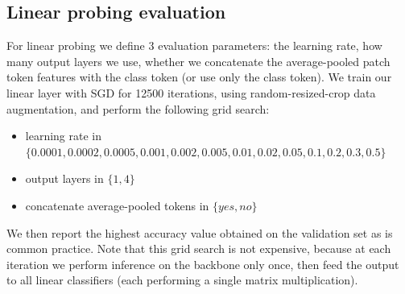 \subsection{Linear probing evaluation}\label{app:linearprobing}
For linear probing we define 3 evaluation parameters: the learning rate, how many output layers we use, whether we concatenate the average-pooled patch token features with the class token (or use only the class token).
We train our linear layer with SGD for 12500 iterations, using random-resized-crop data augmentation, and perform the following grid search:
\begin{itemize}
    \item learning rate in $\{0.0001, 0.0002, 0.0005, 0.001, 0.002, 0.005, 0.01, 0.02, 0.05, 0.1, 0.2, 0.3, 0.5 \}$
    \item output layers in $\{1,4\}$
    \item concatenate average-pooled tokens in $\{yes, no\}$
\end{itemize}
We then report the highest accuracy value obtained on the validation set as is common practice.
Note that this grid search is not expensive, because at each iteration we perform inference on the backbone only once, then feed the output to all linear classifiers (each performing a single matrix multiplication).
